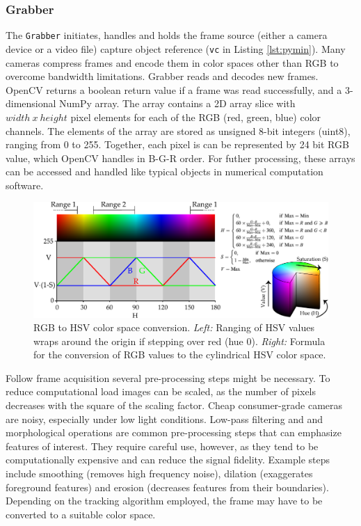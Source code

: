 \subsubsection{Grabber}
\label{sec:Grabber}
The \texttt{Grabber} initiates, handles and holds the frame source (either a camera device or a video file) capture object reference (\texttt{vc} in Listing \ref{lst:pymin}). Many cameras compress frames and encode them in color spaces other than RGB to overcome bandwidth limitations. Grabber reads and decodes new frames. OpenCV returns a boolean return value if a frame was read successfully, and a 3-dimensional NumPy array. The array contains a 2D array slice with $width~x~height$ pixel elements for each of the RGB (red, green, blue) color channels. The elements of the array are stored as unsigned 8-bit integers (uint8), ranging from 0 to 255. Together, each pixel is can be represented by 24 bit RGB value, which OpenCV handles in B-G-R order. For futher processing, these arrays can be accessed and handled like typical objects in numerical computation software.

\begin{figure}%
	\centering
		\includegraphics [width=\linewidth]{gfx/HSV-RGB-comparison_formula.pdf} %
	\caption[Test]{RGB to HSV color space conversion. \emph{Left:} Ranging of HSV values wraps around the origin if stepping over red (hue 0). \emph{Right:} Formula for the conversion of RGB values to the cylindrical HSV color space.}
	\label{fig:HSV}
\end{figure}

Follow frame acquisition several pre-processing steps might be necessary. To reduce computational load images can be scaled, as the number of pixels decreases with the square of the scaling factor. Cheap consumer-grade cameras are noisy, especially under low light conditions. Low-pass filtering and and morphological operations are common pre-processing steps that can emphasize features of interest. They require careful use, however, as they tend to be computationally expensive and can reduce the signal fidelity. Example steps include smoothing (removes high frequency noise), dilation (exaggerates foreground features) and erosion (decreases features from their boundaries). Depending on the tracking algorithm employed, the frame may have to be converted to a suitable color space.%

